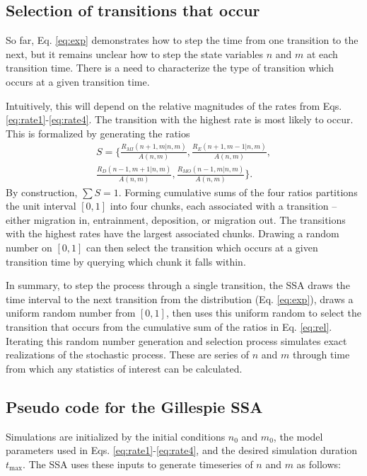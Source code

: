 \subsection{Selection of transitions that occur}
\label{sec:brr}
So far, Eq. \ref{eq:exp} demonstrates how to step the time from one transition to the next, but it remains unclear how to step the state variables $n$ and $m$ at each transition time. There is a need to characterize the type of transition which occurs at a given transition time.

Intuitively, this will depend on the relative magnitudes of the rates from Eqs. \ref{eq:rate1}-\ref{eq:rate4}.
The transition with the highest rate is most likely to occur.
This is formalized by generating the ratios
\begin{multline} S = \Bigg\{\frac{R_{MI}(n+1,m|n,m)}{ A(n,m)},
	\frac{R_E(n+1,m-1|n,m)}{ A(n,m)},\\
	\frac{R_D(n-1,m+1|n,m)}{ A(n,m)},
	\frac{R_{MO}(n-1,m|n,m)}{ A(n,m)}\Bigg\}. \label{eq:rel} \end{multline}
By construction, $\sum S=1$.
Forming cumulative sums of the four ratios partitions the unit interval $[0,1]$ into four chunks, each associated with a transition -- either migration in, entrainment, deposition, or migration out. The transitions with the highest rates have the largest associated chunks. Drawing a random number on $[0,1]$ can then select the transition which occurs at a given transition time by querying which chunk it falls within.

In summary, to step the process through a single transition, the SSA draws the time interval to the next transition from the distribution (Eq. \ref{eq:exp}), draws a uniform random number from $[0,1]$, then uses this uniform random to select the transition that occurs from the cumulative sum of the ratios in Eq. \ref{eq:rel}. Iterating this random number generation and selection process simulates exact realizations of the stochastic process. These are series of $n$ and $m$ through time from which any statistics of interest can be calculated.

\subsection{Pseudo code for the Gillespie SSA}
\label{sec:crr}
Simulations are initialized by the initial conditions $n_0$ and $m_0$, the model parameters used in Eqs. \ref{eq:rate1}-\ref{eq:rate4}, and the desired simulation duration $t_\text{max}$. The SSA uses these inputs to generate timeseries of $n$ and $m$ as follows:

